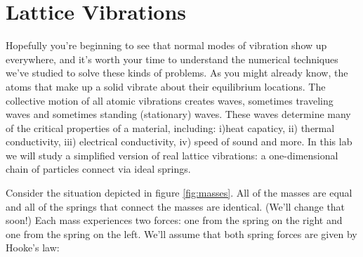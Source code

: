 \chapter{Lattice Vibrations }
\label{Lab:13} 

Hopefully you're beginning to see that normal modes of vibration show
up everywhere, and it's worth your time to understand the numerical
techniques we've studied to solve these kinds of problems. As you
might already know, the atoms that make up a solid vibrate about their
equilibrium locations.  The collective motion of all atomic vibrations
creates waves, sometimes traveling waves and sometimes standing
(stationary) waves.  These waves determine many of the critical
properties of a material, including: i)heat capaticy, ii) thermal
conductivity, iii) electrical conductivity, iv) speed of sound and
more.  In this lab we will study a simplified version of real lattice
vibrations: a one-dimensional chain of particles connect via ideal
springs.





Consider the situation depicted in figure \ref{fig:masses}. All of
the masses are equal and all of the springs that connect the masses are
identical. (We'll change that soon!)  Each mass experiences two
forces: one from the spring on the right and one from the spring on
the left.  We'll assume that both spring forces are given by Hooke's
law:


